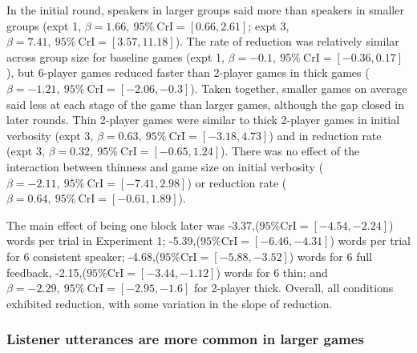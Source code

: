 \documentclass[
  english,
  a4paper,
]{article}
\begin{document}
In the initial round, speakers in larger groups said more than speakers in smaller groups (expt 1, \(\beta=1.66,\:95\%\:\mathrm{CrI}=[0.66, 2.61]\); expt 3, \(\beta=7.41,\:95\%\:\mathrm{CrI}=[3.57, 11.18]\)). The rate of reduction was relatively similar across group size for baseline games (expt 1, \(\beta=-0.1,\:95\%\:\mathrm{CrI}=[-0.36, 0.17]\)), but 6-player games reduced faster than 2-player games in thick games (\(\beta=-1.21,\:95\%\:\mathrm{CrI}=[-2.06, -0.3]\)). Taken together, smaller games on average said less at each stage of the game than larger games, although the gap closed in later rounds. Thin 2-player games were similar to thick 2-player games in initial verbosity (expt 3, \(\beta=0.63,\:95\%\:\mathrm{CrI}=[-3.18, 4.73]\)) and in reduction rate (expt 3, \(\beta=0.32,\:95\%\:\mathrm{CrI}=[-0.65, 1.24]\)). There was no effect of the interaction between thinness and game size on initial verbosity (\(\beta=-2.11,\:95\%\:\mathrm{CrI}=[-7.41, 2.98]\)) or reduction rate (\(\beta=0.64,\:95\%\:\mathrm{CrI}=[-0.61, 1.89]\)).

The main effect of being one block later was -3.37,(\(95\%\mathrm{CrI}=[-4.54, -2.24]\)) words per trial in Experiment 1; -5.39,(\(95\%\mathrm{CrI}=[-6.46, -4.31]\)) words per trial for 6 consistent speaker; -4.68,(\(95\%\mathrm{CrI}=[-5.88, -3.52]\)) words for 6 full feedback, -2.15,(\(95\%\mathrm{CrI}=[-3.44, -1.12]\)) words for 6 thin; and \(\beta=-2.29,\:95\%\:\mathrm{CrI}=[-2.95, -1.6]\) for 2-player thick. Overall, all conditions exhibited reduction, with some variation in the slope of reduction.

\hypertarget{listener-utterances-are-more-common-in-larger-games}{%
\subsubsection{Listener utterances are more common in larger games}\label{listener-utterances-are-more-common-in-larger-games}}
\end{document}

